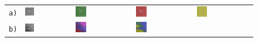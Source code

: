 \begin{figure}[h!]
	\begin{tabular}{m{15pt}m{}m{}m{}m{}}
		\texttt{a)} &
		\includegraphics[width=0.2\textwidth]{images/p03/p03_01.png} &
		\includegraphics[width=0.2\textwidth]{images/gen/fully_connected/p03_01.png_0.png} &
		\includegraphics[width=0.2\textwidth]{images/gen/fully_connected/p03_01.png_1.png} &
		\includegraphics[width=0.2\textwidth]{images/gen/fully_connected/p03_01.png_2.png} \\
		\texttt{b)} &
		\includegraphics[width=0.2\textwidth]{images/p03/p03_02.png} &
		\includegraphics[width=0.2\textwidth]{images/gen/fully_connected/p03_02.png_0.png} &
		\includegraphics[width=0.2\textwidth]{images/gen/fully_connected/p03_02.png_1.png} &

\end{tabular}
\end{figure}
